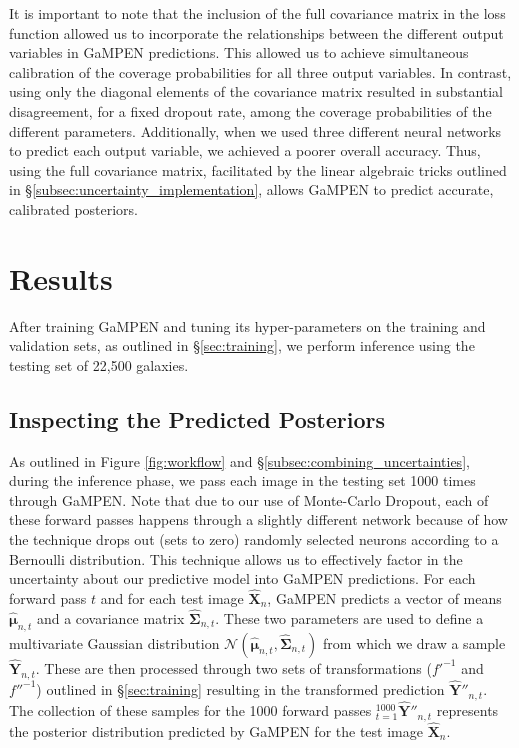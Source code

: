 \documentclass[twocolumn]{aastex63}
\newcommand\gampen{GaMPEN}
\begin{document}
\begin{CJK*}{UTF8}{gbsn}
It is important to note that the inclusion of the full covariance matrix in the loss function allowed us to incorporate the relationships between the different output variables in \gampen{} predictions. This allowed us to achieve simultaneous calibration of the coverage probabilities for all three output variables. 
In contrast, using only the diagonal elements of the covariance matrix resulted in substantial disagreement, for a fixed dropout rate, among the coverage probabilities of the different parameters.
Additionally, when we used three different neural networks to predict each output variable, we achieved a poorer overall accuracy. Thus, using the full covariance matrix, facilitated by the linear algebraic tricks outlined in \S \ref{subsec:uncertainty_implementation}, allows \gampen{} to predict accurate, calibrated posteriors.

\section{Results} \label{sec:results}
After training \gampen{} and tuning its hyper-parameters on the training and validation sets, as outlined in \S \ref{sec:training}, we perform inference using the testing set of 22,500 galaxies. 

\subsection{Inspecting the Predicted Posteriors} \label{subsec:predicted_dists}

As outlined in Figure \ref{fig:workflow} and \S \ref{subsec:combining_uncertainties}, during the inference phase, we pass each image in the testing set 1000 times through \gampen{}. Note that due to our use of Monte-Carlo Dropout, each of these forward passes happens through a slightly different network because of how the technique drops out (sets to zero) randomly selected neurons according to a Bernoulli distribution. This technique allows us to effectively factor in the uncertainty about our predictive model into \gampen{} predictions. For each forward pass $t$ and for each test image $\boldsymbol{\hat{X}}_n$, \gampen{} predicts a vector of means $\boldsymbol{\hat{\mu}}_{n,t}$ and a covariance matrix $\boldsymbol{\hat{\Sigma}}_{n,t}$. These two parameters are used to define a multivariate Gaussian distribution $\mathcal{N}(\boldsymbol{\hat{\mu}}_{n,t},\boldsymbol{\hat{\Sigma}}_{n,t})$ from which we draw a sample $\boldsymbol{\hat{Y}}_{n,t}$. These are then processed through two sets of transformations ($f'^{-1}$ and $f''^{-1}$) outlined in \S \ref{sec:training} resulting in the transformed prediction $\boldsymbol{\hat{Y}''}_{n,t}$. The collection of these samples for the 1000 forward passes $_{t=1}^{1000}\boldsymbol{\hat{Y}''}_{n,t}$ represents the posterior distribution predicted by \gampen{} for the test image $\boldsymbol{\hat{X}}_{n}$.


\end{CJK*}
\end{document}
